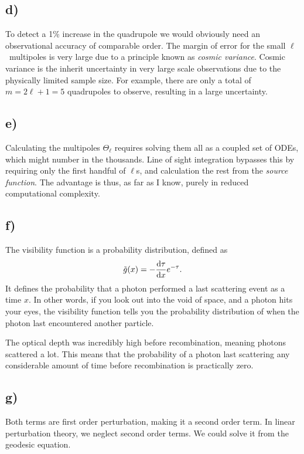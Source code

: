 \documentclass[10pt, a4paper]{article}
\renewcommand{\exp}{e^}
\renewcommand{\exp}{e^}
\begin{document}
\subsection*{d)}
To detect a 1\% increase in the quadrupole we would obviously need an observational accuracy of comparable order. The margin of error for the small $\ell$ multipoles is very large due to a principle known as \textit{cosmic variance}. Cosmic variance is the inherit uncertainty in very large scale observations due to the physically limited sample size. For example, there are only a total of $m = 2\ell + 1 = 5$ quadrupoles to observe, resulting in a large uncertainty.


\subsection*{e)}
Calculating the multipoles $\Theta_\ell$ requires solving them all as a coupled set of ODEs, which might number in the thousands. Line of sight integration bypasses this by requiring only the first handful of $\ell$s, and calculation the rest from the \textit{source function}. The advantage is thus, as far as I know, purely in reduced computational complexity.


\subsection*{f)}
The visibility function is a probability distribution, defined as
\begin{equation}
    \tilde{g}(x) = -\dv{\tau}{x}\exp{-\tau}.
\end{equation}
It defines the probability that a photon performed a last scattering event as a time $x$. In other words, if you look out into the void of space, and a photon hits your eyes, the visibility function tells you the probability distribution of when the photon last encountered another particle.

The optical depth was incredibly high before recombination, meaning photons scattered a lot. This means that the probability of a photon last scattering any considerable amount of time before recombination is practically zero.


\subsection*{g)}
Both terms are first order perturbation, making it a second order term. In linear perturbation theory, we neglect second order terms. We could solve it from the geodesic equation. 
\end{document}
